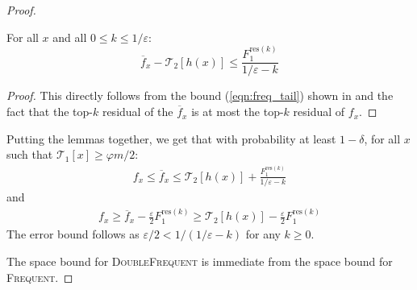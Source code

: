 \documentclass[sigconf,review=true,anonymous=true,screen]{acmart}
\newcommand{\eps}{\varepsilon}
\renewcommand{\phi}{\varphi}
\begin{document}
\begin{proof}
\begin{lemma}
For all $x$ and all $0 \leq k \leq 1/\eps$:
$$\overline{f}_x - \mathcal{T}_2[h(x)] \leq \frac{F_1^{\text{res}(k)}}{1/\eps - k}$$
\end{lemma}
\begin{proof}
This directly follows from the bound (\ref{eqn:freq_tail}) shown in \cite{BICS} and the fact that the top-$k$ residual of the $\overline{f}_x$ is at most the top-$k$ residual of $f_x$.
\end{proof}
Putting the lemmas together, we get that with probability at least $1-\delta$, for all $x$ such that $\mathcal{T}_1[x] \geq \phi m/2$:
\begin{align*}
f_x \leq \overline{f}_x \leq \mathcal{T}_2[h(x)] + \frac{F_1^{\text{res}(k)}}{1/\eps -k}
\end{align*}
and
\begin{align*}
f_x \geq \overline{f}_x - \frac{\eps}{2} F_1^{\text{res}(k)} \geq \mathcal{T}_2[h(x)] - \frac{\eps}{2} F_1^{\text{res}(k)} 
\end{align*}
The error bound follows as $\eps/2 < 1/(1/\eps - k)$ for any $k \geq 0$.

The space bound for \textsc{DoubleFrequent} is immediate from the space bound for \textsc{Frequent}.
\end{proof}
\end{document}
